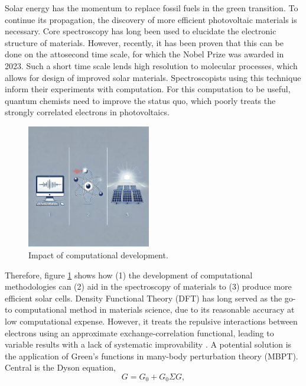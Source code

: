 Solar energy has the momentum to replace fossil fuels in the green transition. To continue its propagation, the discovery of more efficient photovoltaic materials is necessary. Core spectroscopy has long been used to elucidate the electronic structure of materials. However, recently, it has been proven that this can be done on the attosecond time scale, for which the Nobel Prize was awarded in 2023. Such a short time scale lends high resolution to molecular processes, which allows for design of improved solar materials. Spectroscopists using this technique inform their experiments with computation. For this computation to be useful, quantum chemists need to improve the status quo, which poorly treats the strongly correlated electrons in photovoltaics.
\begin{figure}
   \centering
   \includegraphics[width=0.48\textwidth]{picture.png}
   \caption{Impact of computational development.}
   \label{fig:fig1}
\end{figure}
Therefore, figure \ref{fig:fig1} shows how (1) the development of computational methodologies can (2) aid in the spectroscopy of materials to (3) produce more efficient solar cells. Density Functional Theory (DFT) has long served as the go-to computational method in materials science, due to its reasonable accuracy at low computational expense. However, it treats the repulsive interactions between electrons using an approximate exchange-correlation functional, leading to variable results with a lack of systematic improvability \cite{kozlowski_elucidating_2021}. A potential solution is the application of Green's functions in many-body perturbation theory (MBPT). Central is the Dyson equation,
\begin{equation}
G = G_0 + G_0 \Sigma G,
\label{eqn:dyson}
\end{equation}
